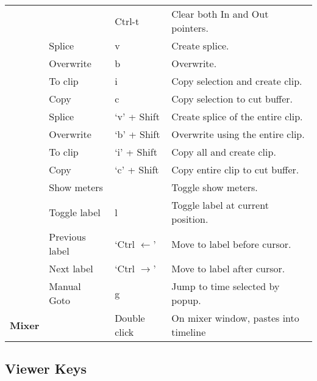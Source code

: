 \begin{longtable}[h]{>{\bfseries}p{}p{}p{}p{}}
  &  & Ctrl-t & Clear both In and Out pointers. \\
  & Splice & v & Create splice. \\
  & Overwrite & b & Overwrite. \\
  & To clip & i & Copy selection and create clip. \\
  & Copy & c & Copy selection to cut buffer. \\
  & Splice & `v' + Shift & Create splice of the entire clip. \\
  & Overwrite & `b' + Shift & Overwrite using the entire clip. \\
  & To clip & `i' + Shift & Copy all and create clip. \\
  & Copy & `c' + Shift & Copy entire clip to cut buffer. \\
  & Show meters &  & Toggle show meters. \\
  & Toggle label & l & Toggle label at current position. \\
  & Previous label & `Ctrl $\leftarrow$' & Move to label before cursor. \\
  & Next label & `Ctrl $\rightarrow$' & Move to label after cursor. \\
  & Manual Goto & g & Jump to time selected by popup. \\
  \midrule
  \textcolor{CinBlueText}{Mixer} &  & Double click & On mixer window, pastes into timeline\\
  \bottomrule
\end{longtable}


\subsection*{Viewer Keys }%
\label{ssec:viewer_keys}

